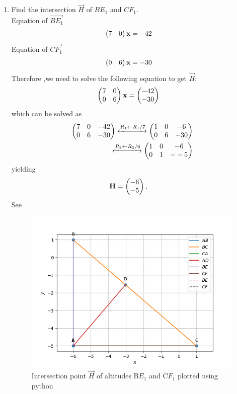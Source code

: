 \documentclass[11pt]{book}
\begin{document}
\begin{enumerate}[label=\thesection.\arabic*.,ref=\thesection.\theenumi]
\item Find the intersection $\vec{H}$ of $BE_1$ and $CF_1$.
 \\  \solution Equation of $\vec{BE_1}$ \\
\begin{align}
    \begin{pmatrix}7 & 0\end{pmatrix}\mathbf{x}&= -42
\end{align}
Equation of $\vec{CF_1}$ \\
\begin{align}
    \begin{pmatrix}0 & 6\end{pmatrix}\mathbf{x}&=-30
\end{align}
Therefore ,we need to solve the following equation to get $\vec{H}:$ \\
\begin{align}
        \begin{pmatrix}7&0\\0&6\end{pmatrix} \mathbf{x} &= \begin{pmatrix}-42\\-30\end{pmatrix}
\end{align}
%
which can be solved as 
%
\begin{align}
        \begin{pmatrix}7&0&-42\\0&6&-30\end{pmatrix}
	 \xleftrightarrow[]{R_1 \leftarrow  R_1/7}
        \begin{pmatrix}1&0&-6\\0&6&-30\end{pmatrix}\\
	 \xleftrightarrow[]{R_2 \leftarrow R_2/6}
        \begin{pmatrix}1&0&-6\\0&1&--5\end{pmatrix} 
\end{align}
%
yielding
%
\begin{align}
        \vec{H}&=\myvec{{-6}\\{-5}}
		\label{eq:geo-alt-H},
\end{align}
%
See 
\begin{figure}[H]
\centering
\includegraphics[width=\columnwidth]{figs/BE&CF.png}
\caption{Intersection point $\vec{H}$ of altitudes B$E_{1}$ and C$F_{1}$ plotted using python}
\label{fig:m_tri_py}
\end{figure}


\end{enumerate}
\end{document}
